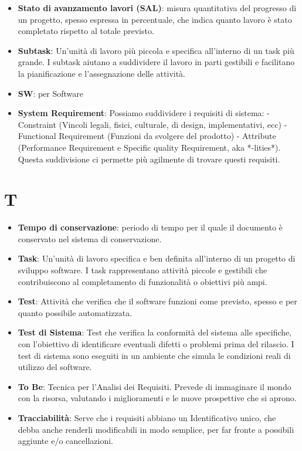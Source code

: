 \documentclass[a4paper,12pt]{article}
\begin{document}
\begin{itemize}
    \item \textbf{Stato di avanzamento lavori (SAL)}: misura quantitativa del progresso di un progetto, spesso espressa in percentuale, che indica quanto lavoro è stato completato rispetto al totale previsto.
    \item \textbf{Subtask}: Un'unità di lavoro più piccola e specifica all'interno di un task più grande. I subtask aiutano a suddividere il lavoro in parti gestibili e facilitano la pianificazione e l'assegnazione delle attività.
    \item \textbf{SW}: per Software
    \item \textbf{System Requirement}: Possiamo suddividere i requisiti di sistema: - Constraint (Vincoli legali, fisici, culturale, di design, implementativi, ecc) - Functional Requirement (Funzioni da svolgere del prodotto) - Attribute (Performance Requirement e Specific quality Requirement, aka *-lities*). Questa suddivisione ci permette più agilmente di trovare questi requisiti.
\end{itemize}
\section{T}
\begin{itemize}
    \item \textbf{Tempo di conservazione}: periodo di tempo per il quale il documento è conservato nel sistema di conservazione.
    \item \textbf{Task}: Un'unità di lavoro specifica e ben definita all'interno di un progetto di sviluppo software. I task rappresentano attività piccole e gestibili che contribuiscono al completamento di funzionalità o obiettivi più ampi.
    \item \textbf{Test}: Attività che verifica che il software funzioni come previsto, spesso e per quanto possibile automatizzata.
    \item \textbf{Test di Sistema}: Test che verifica la conformità del sistema alle specifiche, con l'obiettivo di identificare eventuali difetti o problemi prima del rilascio. I test di sistema sono eseguiti in un ambiente che simula le condizioni reali di utilizzo del software.
    \item \textbf{To Be}: Tecnica per l'Analisi dei Requisiti. Prevede di immaginare il mondo con la risorsa, valutando i miglioramenti e le nuove prospettive che si aprono.
    \item \textbf{Tracciabilità}: Serve che i requisiti abbiano un Identificativo unico, che debba anche renderli modificabili in modo semplice, per far fronte a possibili aggiunte e/o cancellazioni.
\end{itemize}
\end{document}
